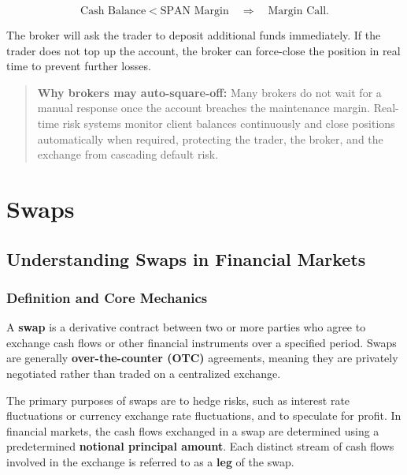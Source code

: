 \documentclass[12pt,openany]{book}
\begin{document}
\begin{equation*}
\text{Cash Balance} < \text{SPAN Margin} \quad \Rightarrow \quad \text{Margin Call}.
\end{equation*}

The broker will ask the trader to deposit additional funds immediately. If the trader does not top up the account, the broker can force-close the position in real time to prevent further losses.

\begin{quote}
\textbf{Why brokers may auto-square-off:} Many brokers do not wait for a manual response once the account breaches the maintenance margin. Real-time risk systems monitor client balances continuously and close positions automatically when required, protecting the trader, the broker, and the exchange from cascading default risk.
\end{quote}

\section{Swaps}

\subsection{Understanding Swaps in Financial Markets}

\subsubsection{Definition and Core Mechanics}
A \textbf{swap} is a derivative contract between two or more parties who agree to exchange cash flows or other financial instruments over a specified period. Swaps are generally \textbf{over-the-counter (OTC)} agreements, meaning they are privately negotiated rather than traded on a centralized exchange.

The primary purposes of swaps are to hedge risks, such as interest rate fluctuations or currency exchange rate fluctuations, and to speculate for profit. In financial markets, the cash flows exchanged in a swap are determined using a predetermined \textbf{notional principal amount}. Each distinct stream of cash flows involved in the exchange is referred to as a \textbf{leg} of the swap.
\end{document}
